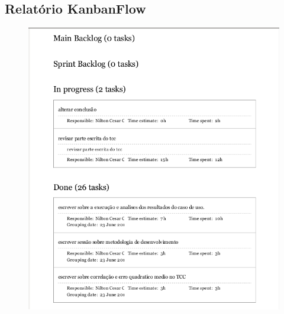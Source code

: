 \begin{apendicesenv}


\chapter{Relatório KanbanFlow}
\label{sec:kanban}

\begin{figure}[h!]
\centering
\includegraphics[keepaspectratio=false,scale=0.70]{figuras/figuras_nilton/kanban1.png}
\end{figure}


\end{apendicesenv}
